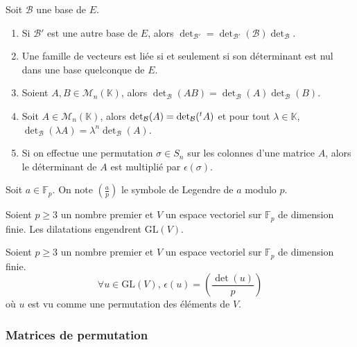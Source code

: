   \begin{corollary}
    Soit $\mathcal{B}$ une base de $E$.
    \begin{enumerate}[label=(\roman*)]
      \item Si $\mathcal{B}'$ est une autre base de $E$, alors $\det_{\mathcal{B}'} = \det_{\mathcal{B}'}(\mathcal{B}) \det_{\mathcal{B}}$.
      \item Une famille de vecteurs est liée si et seulement si son déterminant est nul dans une base quelconque de $E$.
      \item Soient $A, B \in \mathcal{M}_n(\mathbb{K})$, alors $\det_{\mathcal{B}}(AB) = \det_{\mathcal{B}}(A) \det_{\mathcal{B}}(B)$.
      \item Soit $A \in \mathcal{M}_n(\mathbb{K})$, alors $\det_{\mathcal{B}}(A) = \det_{\mathcal{B}}(\mathstrut ^t A)$ et pour tout $\lambda \in \mathbb{K}$, $\det_{\mathcal{B}}(\lambda A) = \lambda^n \det_{\mathcal{B}}(A)$.
      \item Si on effectue une permutation $\sigma \in S_n$ sur les colonnes d'une matrice $A$, alors le déterminant de $A$ est multiplié par $\epsilon(\sigma)$.
    \end{enumerate}
  \end{corollary}


  \begin{notation}
    Soit $a \in \mathbb{F}_p$. On note $\left( \frac{a}{p} \right)$ le symbole de Legendre de $a$ modulo $p$.
  \end{notation}

  \begin{lemma}
    Soient $p \geq 3$ un nombre premier et $V$ un espace vectoriel sur $\mathbb{F}_p$ de dimension finie. Les dilatations engendrent $\mathrm{GL}(V)$.
  \end{lemma}


  \begin{theorem}
    Soient $p \geq 3$ un nombre premier et $V$ un espace vectoriel sur $\mathbb{F}_p$ de dimension finie.
    \[ \forall u \in \mathrm{GL}(V), \, \epsilon(u) = \left( \frac{\det(u)}{p} \right) \]
    où $u$ est vu comme une permutation des éléments de $V$.
  \end{theorem}

  \subsubsection{Matrices de permutation}

